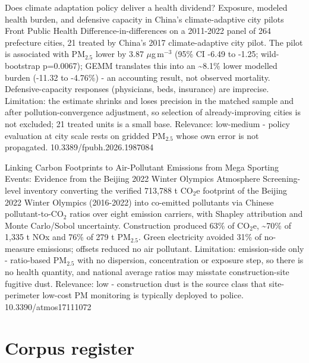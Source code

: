 \documentclass[10pt]{article}
\begin{document}
{Does climate adaptation policy deliver a health dividend? Exposure, modeled health burden, and defensive capacity in China's climate-adaptive city pilots}
{Front Public Health}
{Difference-in-differences on a 2011-2022 panel of 264 prefecture cities, 21 treated by China's 2017 climate-adaptive city pilot. The pilot is associated with PM$_{2.5}$ lower by 3.87 $\mu$g\,m$^{-3}$ (95\% CI -6.49 to -1.25; wild-bootstrap p=0.0067); GEMM translates this into an \textasciitilde{}8.1\% lower modelled burden (-11.32 to -4.76\%) - an accounting result, not observed mortality. Defensive-capacity responses (physicians, beds, insurance) are imprecise. Limitation: the estimate shrinks and loses precision in the matched sample and after pollution-convergence adjustment, so selection of already-improving cities is not excluded; 21 treated units is a small base. Relevance: low-medium - policy evaluation at city scale rests on gridded PM$_{2.5}$ whose own error is not propagated.}
{10.3389/fpubh.2026.1987084}

{Linking Carbon Footprints to Air-Pollutant Emissions from Mega Sporting Events: Evidence from the Beijing 2022 Winter Olympics}
{Atmosphere}
{Screening-level inventory converting the verified 713,788 t CO$_2$e footprint of the Beijing 2022 Winter Olympics (2016-2022) into co-emitted pollutants via Chinese pollutant-to-CO$_2$ ratios over eight emission carriers, with Shapley attribution and Monte Carlo/Sobol uncertainty. Construction produced 63\% of CO$_2$e, \textasciitilde{}70\% of 1,335 t NOx and 76\% of 279 t PM$_{2.5}$. Green electricity avoided 31\% of no-measure emissions; offsets reduced no air pollutant. Limitation: emission-side only - ratio-based PM$_{2.5}$ with no dispersion, concentration or exposure step, so there is no health quantity, and national average ratios may misstate construction-site fugitive dust. Relevance: low - construction dust is the source class that site-perimeter low-cost PM monitoring is typically deployed to police.}
{10.3390/atmos17111072}

\clearpage
\section*{\sffamily\bfseries\color{Deep}Corpus register}
\vspace{-1.5mm}{\color{Amber}\rule{\linewidth}{1.1pt}}\vspace{2.5mm}
\end{document}
